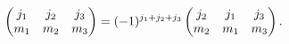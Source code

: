 \[\begin{pmatrix}j_{1}&j_{2}&j_{3}\\
m_{1}&m_{2}&m_{3}\end{pmatrix}=(-1)^{j_{1}+j_{2}+j_{3}}\begin{pmatrix}j_{2}&j_%
{1}&j_{3}\\
m_{2}&m_{1}&m_{3}\end{pmatrix}.\]